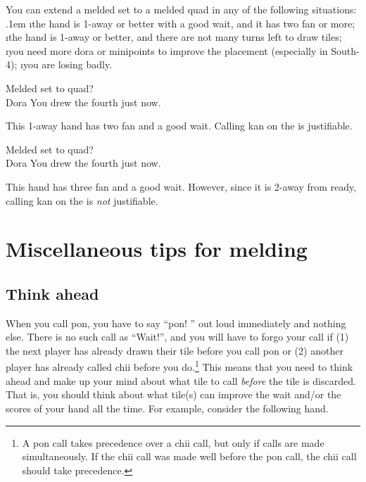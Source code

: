 \bigskip
You can extend a melded set to a melded quad in any of the following situations:
\bi \itemsep.1em
\i the hand is 1-away or better with a good wait, and it has two {\jap fan} or more;
\i the hand is 1-away or better, and there are not many turns left to draw tiles;
\i you need more {\jap dora} or minipoints to improve the placement (especially in South-4);
\i you are losing badly.
\ei

\bigskip
\begin{itembox}[r]{Melded set to quad?}
\bp
{}~\zhong\rzhong\zhong~\\
\hspace{305pt}\footnotesize{\jap Dora}
\ep
\vspace{-20pt}You drew the fourth {\large\zhong} just now.
\end{itembox}
\noindent This 1-away hand has two {\jap fan} and a good wait. Calling {\jap kan} on the {\large\zhong} is justifiable. 

\bigskip
\begin{itembox}[r]{Melded set to quad?}
\bp
{}~\zhong\rzhong\zhong~\\
\hspace{305pt}\footnotesize{\jap Dora}
\ep
\vspace{-20pt}You drew the fourth {\large\zhong} just now.
\end{itembox}
\noindent This hand has three {\jap fan} and a good wait. However, since it is 2-away from ready, calling {\jap kan} on the {\large\zhong} is \emph{not} justifiable. 

\section{Miscellaneous tips for melding}

\subsection{Think ahead}

When you call {\jap pon}, you have to say ``{\jap pon}! \textipa{[p\'\textopeno\ng]}'' out loud immediately and nothing else. There is no such call as ``Wait!'',  and you will have to forgo your call if (1) the next player has already drawn their tile before you call {\jap pon} or (2) another player has already called {\jap chii} before you do.\footnote{A {\jap pon} call takes precedence over a {\jap chii} call, but only if calls are made simultaneously. If the {\jap chii} call was made well before the {\jap pon} call, the {\jap chii} call should take precedence.}
This means that you need to think ahead and make up your mind about what tile to call \emph{before} the tile is discarded. That is, you should think about what tile(s) can improve the wait and/or the scores of your hand all the time. For example, consider the following hand. 

